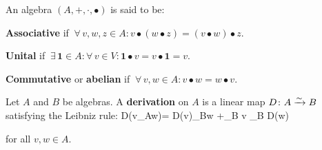 An algebra $(A,+,\cdot,\bullet)$ is said to be:
\ben[label=\roman*)]
\item \textbf{Associative} if $\ \forall \, v,w,z\in A : v\bullet (w\bullet z) = (v\bullet w)\bullet z$.
\item \textbf{Unital} if $\ \exists \, \mathbf{1} \in A : \forall \, v \in V : \mathbf{1}\bullet v = v \bullet
\mathbf{1} = v$.
\item \textbf{Commutative} or \textbf{abelian} if $\ \forall \, v,w\in A : v\bullet w = w\bullet v$.
\een
\ed

\bd [Derivation]
Let $A$ and $B$ be algebras. A \textbf{derivation} on $A$ is a linear map $D\colon A \xrightarrow{\sim}B$ satisfying the
Leibniz rule:
\bse
D(v\bullet_Aw)= D(v)\bullet_Bw +_B v \bullet_B D(w)
\ese

for all $v,w \in A$.
\ed